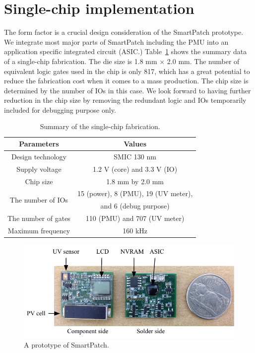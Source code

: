 \documentclass[journal]{IEEEtran}
\begin{document}
\section{Single-chip implementation}

The form factor is a crucial design consideration of the SmartPatch prototype.  
We integrate most major parts of SmartPatch including the PMU into an application specific integrated circuit (ASIC.)
Table~\ref{table:fab_summary} shows the summary data of a single-chip fabrication. 
The die size is 1.8 mm $\times$ 2.0 mm. 
The number of equivalent logic gates used in the chip is only 817, which has a great potential to reduce the fabrication cost when it comes to a mass production. 
The chip size is determined by the number of IOs in this case. 
We look forward to having further reduction in the chip size by removing the redundant logic and IOs temporarily included for debugging purpose only.

\begin{table}
\centering
\caption{Summary of the single-chip fabrication.}
\label{table:fab_summary}
\begin{tabular}{|c|c|}  \hline
Parameters			&Values	\\ \hline \hline
Design technology		&SMIC 130 nm  \\ \hline
Supply voltage		&1.2 V (core) and 3.3 V (IO) \\ \hline
Chip size				&1.8 mm by 2.0 mm \\ \hline
\multirow{2}{*}{The number of IOs}		&15 (power), 8 (PMU), 19 (UV meter), \\
					&and 6 (debug purpose) \\ \hline		
The number of gates	&110 (PMU) and 707 (UV meter) \\ \hline
Maximum frequency	&160 kHz \\ \hline		
\end{tabular}
\end{table}

\begin{figure}
\centering
\includegraphics[width=1.0\hsize]{Figures/prototype.pdf}
\caption{A prototype of SmartPatch.}
\label{fig:prototype}
\end{figure}      
\end{document}
